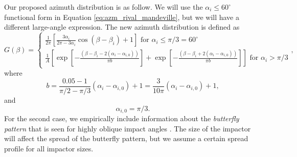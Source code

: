 \documentclass{hitec}
\numberwithin{equation}{section}
\begin{document}
Our proposed azimuth distribution is as follow. We will use the $\alpha_i \le 60^\circ$ functional form in Equation \eqref{eq:azm_rival_mandeville}, but we will have a different large-angle expression. The new azimuth distribution is defined as
\begin{equation}\label{eq:alt-azm-dist}
G(\beta) =
\begin{cases}
\frac{1}{2\pi}\left[\frac{3\alpha_i}{2\pi - 3\alpha_i}\cos(\beta-\beta_i)+1\right] \text{  for $\alpha_i\le \pi/3 = 60^\circ$}\\
\frac{1}{A}\left[\exp\left[-\frac{(\beta-\beta_i - 2(\alpha_i-\alpha_{i,0}))}{\pi b}\right] + \exp\left[-\frac{(\beta-\beta_i + 2(\alpha_i-\alpha_{i,0}))}{\pi b}\right]\right] \text{  for $\alpha_i > \pi/3$}
\end{cases},
\end{equation}
where
\begin{equation}
b = \frac{0.05-1}{\pi/2-\pi/3}(\alpha_i-\alpha_{i,0}) + 1 = \frac{3}{10\pi}(\alpha_i-\alpha_{i,0}) + 1,
\end{equation}
and
\begin{equation}
\alpha_{i,0} = \pi/3.
\end{equation}
For the second case, we empirically include information about the \textit{butterfly pattern} that is seen for highly oblique impact angles \citep[e.g.,][]{shuvalov2011ejecta}. The size of the impactor will affect the spread of the butterfly pattern, but we assume a certain spread profile for all impactor sizes.
\end{document}
